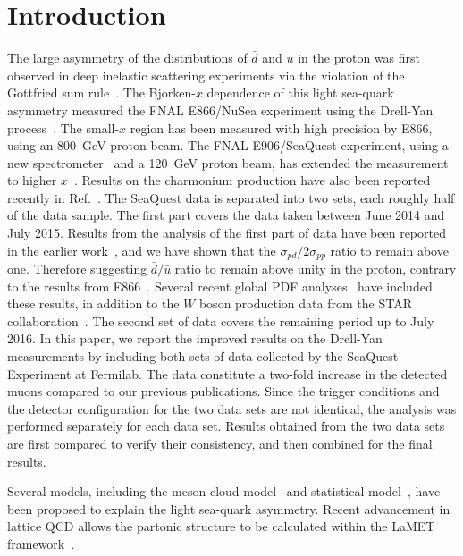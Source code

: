 \documentclass[reprint,aps,unsortedaddress,superscriptaddress,prc,floatfix,showpacs,linenumbers]{revtex4-2}
\begin{document}
\section{Introduction}
The large asymmetry of the distributions of $\bar{d}$ and $\bar{u}$ in the proton was first observed in deep inelastic
scattering experiments via the violation of the Gottfried sum rule~\cite{amaudruz1991}. 
The Bjorken-$x$ dependence of this light sea-quark asymmetry measured the FNAL E866/NuSea
experiment using the Drell-Yan process~\cite{towell2001}.
The small-$x$ region has been measured with high precision by E866,
using an \SI{800}{\GeV} proton beam. 
The FNAL E906/SeaQuest experiment, using a new spectrometer~\cite{aidala2019} and a \SI{120}{\GeV}
proton beam, has extended the measurement to higher $x$~\cite{dove2021,dove2023}. 
Results on the charmonium production have also been reported recently in Ref.~\cite{leung2024a}.
The SeaQuest data is separated into two sets, each roughly half of the data sample.
The first part covers the data taken between June 2014 and July 2015.
Results from the analysis of the first part of data have been reported in the earlier work~\cite{dove2021,dove2023}, 
and we have shown that the $\sigma_{pd}/2\sigma_{pp}$ ratio to remain above one.
Therefore suggesting $\bar{d}/\bar{u}$ ratio to remain above unity in the proton,
contrary to the results from E866~\cite{towell2001}.
Several recent global PDF analyses~\cite{cocuzza2021,ball2022a,accardi2023,alekhin2023}
have included these results, in addition to the $W$ boson production data from the STAR collaboration~\cite{adam2021}.
The second set of data covers the remaining period up to July 2016.
In this paper, we report the improved results on the Drell-Yan measurements
by including both sets of data collected by the SeaQuest Experiment at Fermilab.
The data constitute a two-fold increase in the detected muons compared to our previous publications.
Since the trigger
conditions and the detector configuration for the two data sets are not
identical, the analysis was performed separately for each data set. 
Results obtained from the two data sets are first compared to verify their
consistency, and then combined for the final results.


Several models, including the meson cloud model~\cite{alberg2022} and statistical model~\cite{soffer2019},
have been proposed to explain the light sea-quark asymmetry.
Recent advancement in lattice QCD allows the partonic structure to be calculated within the LaMET framework~\cite{constantinou2021}.
\end{document}
